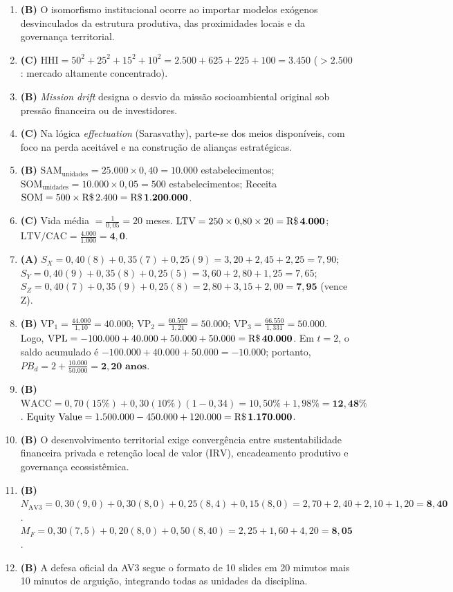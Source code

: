 \begin{boxGabarito}
\begin{enumerate}[leftmargin=1.5em, itemsep=4pt]
  \item \textbf{(B)} O isomorfismo institucional ocorre ao importar modelos exógenos desvinculados da estrutura produtiva, das proximidades locais e da governança territorial.
  \item \textbf{(C)} $\text{HHI} = 50^2 + 25^2 + 15^2 + 10^2 = 2.500 + 625 + 225 + 100 = \mathbf{3.450}$ ($> 2.500$: mercado altamente concentrado).
  \item \textbf{(B)} \textit{Mission drift} designa o desvio da missão socioambiental original sob pressão financeira ou de investidores.
  \item \textbf{(C)} Na lógica \textit{effectuation} (Sarasvathy), parte-se dos meios disponíveis, com foco na perda aceitável e na construção de alianças estratégicas.
  \item \textbf{(B)} $\text{SAM}_{\text{unidades}} = 25.000 \times 0{,}40 = 10.000$ estabelecimentos; $\text{SOM}_{\text{unidades}} = 10.000 \times 0{,}05 = 500$ estabelecimentos; Receita $\text{SOM} = 500 \times \text{R\$\,}{2.400} = \mathbf{\text{R\$\,}{1.200.000}}$.
  \item \textbf{(C)} Vida média $= \frac{1}{0{,}05} = 20$ meses. $\text{LTV} = 250 \times 0{,}80 \times 20 = \mathbf{\text{R\$\,}{4.000}}$; $\text{LTV/CAC} = \frac{4.000}{1.000} = \mathbf{4{,}0}$.
  \item \textbf{(A)} $S_X = 0{,}40(8)+0{,}35(7)+0{,}25(9) = 3{,}20+2{,}45+2{,}25 = 7{,}90$; $S_Y = 0{,}40(9)+0{,}35(8)+0{,}25(5) = 3{,}60+2{,}80+1{,}25 = 7{,}65$; $S_Z = 0{,}40(7)+0{,}35(9)+0{,}25(8) = 2{,}80+3{,}15+2{,}00 = \mathbf{7{,}95}$ (vence Z).
  \item \textbf{(B)} $\text{VP}_1 = \frac{44.000}{1{,}10} = 40.000$; $\text{VP}_2 = \frac{60.500}{1{,}21} = 50.000$; $\text{VP}_3 = \frac{66.550}{1{,}331} = 50.000$. Logo, $\text{VPL} = -100.000 + 40.000 + 50.000 + 50.000 = \mathbf{\text{R\$\,}{40.000}}$. Em $t=2$, o saldo acumulado é $-100.000 + 40.000 + 50.000 = -10.000$; portanto, $PB_d = 2 + \frac{10.000}{50.000} = \mathbf{2{,}20\text{ anos}}$.
  \item \textbf{(B)} $\text{WACC} = 0{,}70(15\%) + 0{,}30(10\%)(1 - 0{,}34) = 10{,}50\% + 1{,}98\% = \mathbf{12{,}48\%}$. $\text{Equity Value} = 1.500.000 - 450.000 + 120.000 = \mathbf{\text{R\$\,}{1.170.000}}$.
  \item \textbf{(B)} O desenvolvimento territorial exige convergência entre sustentabilidade financeira privada e retenção local de valor ($\text{IRV}$), encadeamento produtivo e governança ecossistêmica.
  \item \textbf{(B)} $N_{\text{AV3}} = 0{,}30(9{,}0) + 0{,}30(8{,}0) + 0{,}25(8{,}4) + 0{,}15(8{,}0) = 2{,}70 + 2{,}40 + 2{,}10 + 1{,}20 = \mathbf{8{,}40}$. $M_F = 0{,}30(7{,}5) + 0{,}20(8{,}0) + 0{,}50(8{,}40) = 2{,}25 + 1{,}60 + 4{,}20 = \mathbf{8{,}05}$.
  \item \textbf{(B)} A defesa oficial da AV3 segue o formato de 10 slides em 20 minutos mais 10 minutos de arguição, integrando todas as unidades da disciplina.
\end{enumerate}
\end{boxGabarito}


